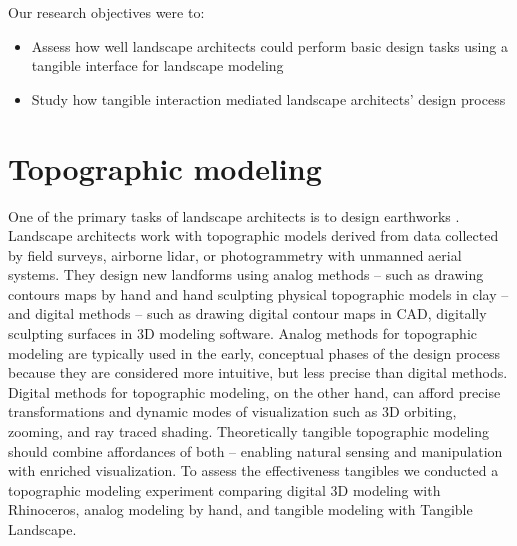 \documentclass[Afour,sagev,times]{sagej} %
\begin{document}
Our research objectives were to:
%
\begin{itemize}
\item Assess how well landscape architects could perform 
basic design tasks using a tangible interface for landscape modeling
\item Study how tangible interaction mediated
landscape architects' design process
\end{itemize}


\section{Topographic modeling}
%
One of the primary tasks of landscape architects is to design earthworks
\cite{Petschek2008,Strom2013}. 
Landscape architects work with topographic models 
derived from data collected by field surveys, airborne lidar, 
or photogrammetry with unmanned aerial systems.
They design new landforms 
using analog methods -- such as 
drawing contours maps by hand and
hand sculpting physical topographic models in clay --
and digital methods -- such as 
drawing digital contour maps in CAD,
digitally sculpting surfaces in 3D modeling software. 
Analog methods for topographic modeling are typically used 
in the early, conceptual phases of the design process because 
they are considered more intuitive, but less precise than digital methods.
Digital methods for topographic modeling, on the other hand, 
can afford precise transformations and
dynamic modes of visualization such as 
3D orbiting, zooming, and ray traced shading.
Theoretically tangible topographic modeling 
should combine affordances of both -- 
enabling natural sensing and manipulation
with enriched visualization.
To assess the effectiveness tangibles
we conducted a topographic modeling experiment
comparing 
digital 3D modeling with Rhinoceros, 
analog modeling by hand, 
and tangible modeling with Tangible Landscape. 
\end{document}
